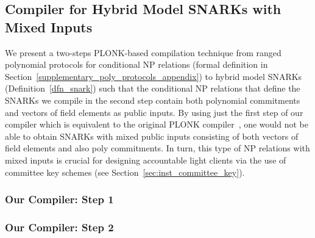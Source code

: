 \subsection{Compiler for Hybrid Model SNARKs with Mixed Inputs}
\label{sec_two_step_compiler}

\noindent We present a two-steps PLONK-based compilation technique from 
ranged polynomial protocols for conditional NP relations (formal definition in Section~\ref{supplementary_poly_protocols_appendix}) to hybrid 
model SNARKs (Definition~\ref{dfn_snark}) such that the conditional NP relations that define the SNARKs we compile in the 
second step contain both polynomial commitments and vectors of field elements as public inputs. By using just the first step of our 
compiler which is equivalent to the original PLONK compiler~\cite{plonk}, one would 
not be able to obtain SNARKs with mixed public inputs consisting of both vectors of field elements and also poly commitments. 
In turn, this type of NP relations with mixed inputs is crucial for designing accountable light clients via the use of committee key schemes 
(see Section~\ref{sec:inst_committee_key}).\\
\vspace{-0.2in}
\subsubsection{Our Compiler: Step 1} 
\label{compiler_step_1}
\vspace{-0.05in}
%

\vspace{-0.2in}
\subsubsection{Our Compiler: Step 2}
\label{compiler_step_2}
\vspace{-0.05in}


